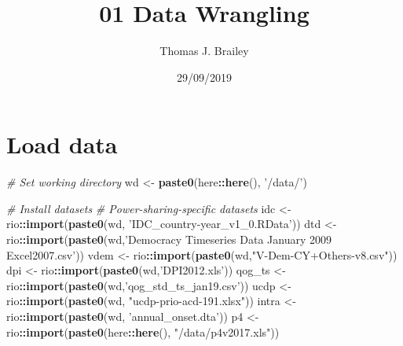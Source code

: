 \documentclass[
]{article}
\title{01 Data Wrangling}
\author{Thomas J. Brailey}
\date{29/09/2019}
\newenvironment{Shaded}{\begin{snugshade}}{\end{snugshade}}
\newcommand{\CommentTok}[1]{\textcolor[rgb]{0.56,0.35,0.01}{\textit{#1}}}
\newcommand{\KeywordTok}[1]{\textcolor[rgb]{0.13,0.29,0.53}{\textbf{#1}}}
\newcommand{\NormalTok}[1]{#1}
\newcommand{\OperatorTok}[1]{\textcolor[rgb]{0.81,0.36,0.00}{\textbf{#1}}}
\newcommand{\StringTok}[1]{\textcolor[rgb]{0.31,0.60,0.02}{#1}}
\begin{document}
\maketitle

{
\setcounter{tocdepth}{2}
\tableofcontents
}
\hypertarget{load-data}{%
\section{Load data}\label{load-data}}

\begin{Shaded}
\begin{Highlighting}[]
\CommentTok{# Set working directory }
\NormalTok{wd <-}\StringTok{ }\KeywordTok{paste0}\NormalTok{(here}\OperatorTok{::}\KeywordTok{here}\NormalTok{(), }\StringTok{'/data/'}\NormalTok{) }

\CommentTok{# Install datasets}
\CommentTok{# Power-sharing-specific datasets}
\NormalTok{idc <-}\StringTok{ }\NormalTok{rio}\OperatorTok{::}\KeywordTok{import}\NormalTok{(}\KeywordTok{paste0}\NormalTok{(wd, }\StringTok{'IDC_country-year_v1_0.RData'}\NormalTok{))}
\NormalTok{dtd <-}\StringTok{ }\NormalTok{rio}\OperatorTok{::}\KeywordTok{import}\NormalTok{(}\KeywordTok{paste0}\NormalTok{(wd,}\StringTok{'Democracy Timeseries Data January 2009 Excel2007.csv'}\NormalTok{))}
\NormalTok{vdem <-}\StringTok{ }\NormalTok{rio}\OperatorTok{::}\KeywordTok{import}\NormalTok{(}\KeywordTok{paste0}\NormalTok{(wd,}\StringTok{"V-Dem-CY+Others-v8.csv"}\NormalTok{))}
\NormalTok{dpi <-}\StringTok{ }\NormalTok{rio}\OperatorTok{::}\KeywordTok{import}\NormalTok{(}\KeywordTok{paste0}\NormalTok{(wd,}\StringTok{'DPI2012.xls'}\NormalTok{))}
\NormalTok{qog_ts <-}\StringTok{ }\NormalTok{rio}\OperatorTok{::}\KeywordTok{import}\NormalTok{(}\KeywordTok{paste0}\NormalTok{(wd,}\StringTok{'qog_std_ts_jan19.csv'}\NormalTok{))}
\NormalTok{ucdp <-}\StringTok{ }\NormalTok{rio}\OperatorTok{::}\KeywordTok{import}\NormalTok{(}\KeywordTok{paste0}\NormalTok{(wd, }\StringTok{"ucdp-prio-acd-191.xlsx"}\NormalTok{))}
\NormalTok{intra <-}\StringTok{ }\NormalTok{rio}\OperatorTok{::}\KeywordTok{import}\NormalTok{(}\KeywordTok{paste0}\NormalTok{(wd, }\StringTok{'annual_onset.dta'}\NormalTok{))}
\NormalTok{p4 <-}\StringTok{ }\NormalTok{rio}\OperatorTok{::}\KeywordTok{import}\NormalTok{(}\KeywordTok{paste0}\NormalTok{(here}\OperatorTok{::}\KeywordTok{here}\NormalTok{(), }\StringTok{"/data/p4v2017.xls"}\NormalTok{))}
\end{Highlighting}
\end{Shaded}
\end{document}
